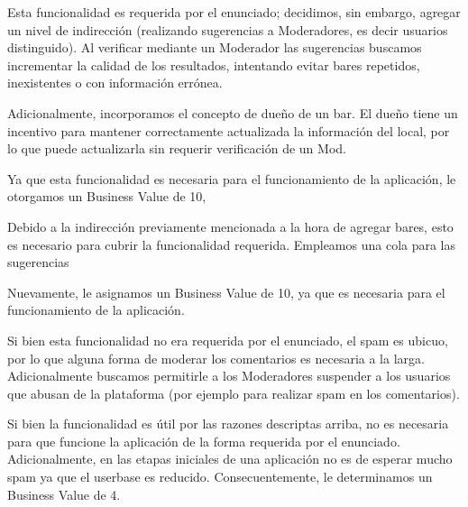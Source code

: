 
\par Esta funcionalidad es requerida por el enunciado; decidimos, sin embargo, agregar un nivel de indirección (realizando sugerencias a Moderadores, es decir usuarios distinguido).
Al verificar mediante un Moderador las sugerencias buscamos incrementar la calidad de los resultados, intentando evitar bares repetidos, inexistentes o con información errónea.

\par Adicionalmente, incorporamos el concepto de dueño de un bar. 
El dueño tiene un incentivo para mantener correctamente actualizada la información del local, por lo que puede actualizarla sin requerir verificación de un Mod.

\par Ya que esta funcionalidad es necesaria para el funcionamiento de la aplicación, le otorgamos un Business Value de 10,


\par Debido a la indirección previamente mencionada a la hora de agregar bares, esto es necesario para cubrir la funcionalidad requerida.
Empleamos una cola para las sugerencias 

\par Nuevamente, le asignamos un Business Value de 10, ya que es necesaria para el funcionamiento de la aplicación.


\par Si bien esta funcionalidad no era requerida por el enunciado, el spam es ubicuo, por lo que alguna forma de moderar los comentarios es necesaria a la larga.
Adicionalmente buscamos permitirle a los Moderadores suspender a los usuarios que abusan de la plataforma (por ejemplo para realizar spam en los comentarios).

\par Si bien la funcionalidad es útil por las razones descriptas arriba, no es necesaria para que funcione la aplicación de la forma requerida por el enunciado.
Adicionalmente, en las etapas iniciales de una aplicación no es de esperar mucho spam ya que el userbase es reducido.
Consecuentemente, le determinamos un Business Value de 4.
